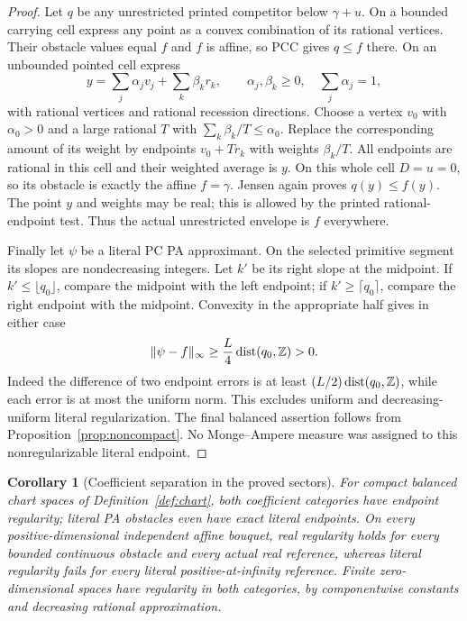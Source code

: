 \documentclass[11pt]{article}
\newtheorem{corollary}[theorem]{Corollary}
\theoremstyle{definition}\newtheorem{definition}[theorem]{Definition}
\theoremstyle{remark}\newtheorem{remark}[theorem]{Remark}
\begin{document}
\begin{proof}
Let $q$ be any unrestricted printed competitor below $\gamma+u$. On a bounded carrying cell express any point as a convex combination of its rational vertices. Their obstacle values equal $f$ and $f$ is affine, so PCC gives $q\leq f$ there. On an unbounded pointed cell express
\[
 y=\sum_j\alpha_j v_j+\sum_k\beta_k r_k,\qquad
 \alpha_j,\beta_k\geq0,\quad\sum_j\alpha_j=1,
\]
with rational vertices and rational recession directions. Choose a vertex $v_0$ with $\alpha_0>0$ and a large rational $T$ with $\sum_k\beta_k/T\leq\alpha_0$. Replace the corresponding amount of its weight by endpoints $v_0+Tr_k$ with weights $\beta_k/T$. All endpoints are rational in this cell and their weighted average is $y$. On this whole cell $D=u=0$, so its obstacle is exactly the affine $f=\gamma$. Jensen again proves $q(y)\leq f(y)$. The point $y$ and weights may be real; this is allowed by the printed rational-endpoint test. Thus the actual unrestricted envelope is $f$ everywhere.

Finally let $\psi$ be a literal PC PA approximant. On the selected primitive segment its slopes are nondecreasing integers. Let $k'$ be its right slope at the midpoint. If $k'\leq\lfloor q_0\rfloor$, compare the midpoint with the left endpoint; if $k'\geq\lceil q_0\rceil$, compare the right endpoint with the midpoint. Convexity in the appropriate half gives in either case
\[
 \|\psi-f\|_\infty\geq \frac L4\operatorname{dist}(q_0,\mathbb Z)>0.
\]
Indeed the difference of two endpoint errors is at least $(L/2)\operatorname{dist}(q_0,\mathbb Z)$, while each error is at most the uniform norm. This excludes uniform and decreasing-uniform literal regularization. The final balanced assertion follows from Proposition~\ref{prop:noncompact}. No Monge--Ampere measure was assigned to this nonregularizable literal endpoint.
\end{proof}

\begin{corollary}[Coefficient separation in the proved sectors]
For compact balanced chart spaces of Definition~\ref{def:chart}, both coefficient categories have endpoint regularity; literal PA obstacles even have exact literal endpoints. On every positive-dimensional independent affine bouquet, real regularity holds for every bounded continuous obstacle and every actual real reference, whereas literal regularity fails for every literal positive-at-infinity reference. Finite zero-dimensional spaces have regularity in both categories, by componentwise constants and decreasing rational approximation.
\end{corollary}
\end{document}
